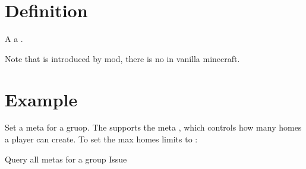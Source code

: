 \section{Definition}
A  a .

\begin{note}{}
    Note that  is introduced by  mod, there is no  in vanilla minecraft.
\end{note}


\section{Example}{}
\begin{example}{Set a meta for a gruop.}
    The  supports the meta , which controls how many homes a player can create.
    To set the max homes limits to : 
\end{example}

\begin{example}{Query all metas for a group}
    Issue 
\end{example}